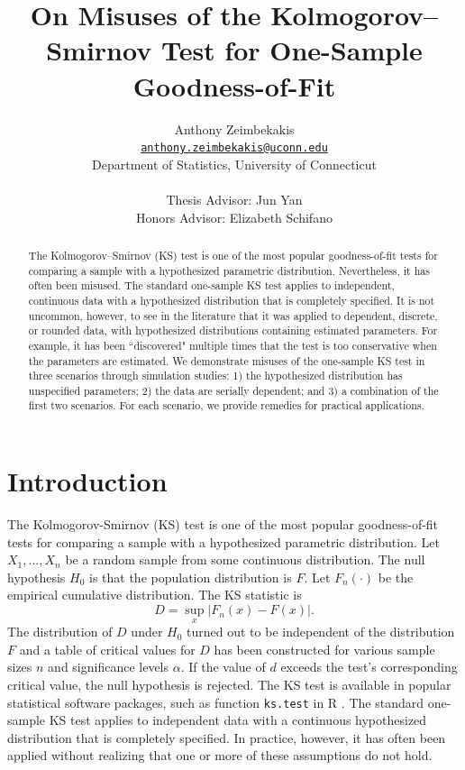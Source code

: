 \documentclass[12pt, letterpaper, titlepage]{article}
\title{On Misuses of the Kolmogorov--Smirnov Test for One-Sample Goodness-of-Fit}
\author{Anthony Zeimbekakis\\
\href{mailto:anthony.zeimbekakis@uconn.edu}
{\nolinkurl{anthony.zeimbekakis@uconn.edu}}\\
Department of Statistics, University of Connecticut\\\\
Thesis Advisor: Jun Yan\\
Honors Advisor: Elizabeth Schifano}
\date{}
\begin{document}
\maketitle

\doublespace

\begin{abstract}
The Kolmogorov--Smirnov (KS) test is one of the most popular goodness-of-fit tests 
for comparing a sample with a hypothesized parametric distribution. 
Nevertheless, it has often been misused. The standard one-sample KS test applies
to independent, continuous data with a hypothesized distribution that is 
completely specified. It is not uncommon, however, to see in the literature that
it was applied to dependent, discrete, or rounded data, with hypothesized 
distributions containing estimated parameters. For example, it has been 
``discovered" multiple times that the test is too conservative when the 
parameters are estimated. We demonstrate misuses of the one-sample KS test in 
three scenarios through simulation studies:
1) the hypothesized distribution has unspecified parameters;
2) the data are serially dependent; and
3) a combination of the first two scenarios.
For each scenario, we provide remedies for practical applications.
\end{abstract}

\section{Introduction}
\label{sec:intro}

The Kolmogorov-Smirnov (KS) test is one of the most popular goodness-of-fit 
tests for comparing a sample with a hypothesized parametric distribution.
Let $X_1, ..., X_n$ be a random sample from some continuous distribution. 
The null hypothesis $H_0$ is that the population distribution is $F$.
Let $F_n(\cdot)$ be the empirical cumulative distribution. The KS statistic is
\begin{equation}
  \label{eq:ks_standard}
  D = \sup_x | F_{n}(x) - F(x) |.
\end{equation}
The distribution of $D$ under $H_0$ turned out to be independent of the
distribution $F$ and a table of critical values for $D$ has been constructed
\citep{Massey} for various sample sizes $n$ and significance 
levels $\alpha$. If the value of $d$ exceeds the test's corresponding critical 
value, the null hypothesis is rejected. The KS test is available in popular 
statistical software packages, such as function \texttt{ks.test} in R 
\citep{R, Marsaglia}.
The standard one-sample KS test applies to independent data with a continuous
hypothesized distribution that is completely specified. In practice, however, it
has often been applied without realizing that one or more of these assumptions
do not hold.
\end{document}
